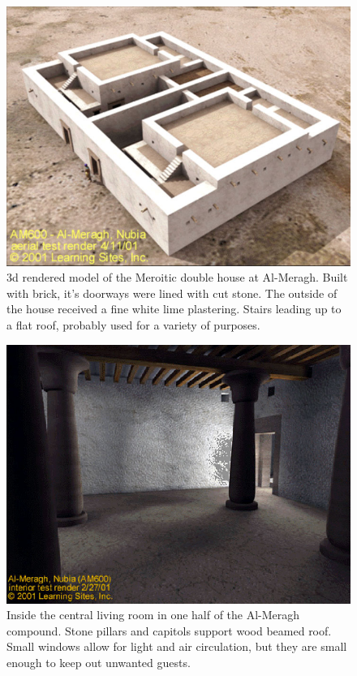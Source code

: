\documentclass[a4paper,12pt]{scrreprt}
\begin{document}
\begin{figure}[H]
	\centering
	\includegraphics[width=\textwidth]{img/house/3d_model_of_meroitic_double_house}
	\caption{3d rendered model of the Meroitic double house at Al-Meragh. Built with brick, it's doorways were lined with cut stone. The outside of the house received a fine white lime plastering. Stairs leading up to a flat roof, probably used for a variety of purposes.}
\end{figure}

\begin{figure}[H]
	\centering
	\includegraphics[width=\textwidth]{img/house/double_house_inside}
	\caption{Inside the central living room in one half of the Al-Meragh compound. Stone pillars and capitols support wood beamed roof. Small windows allow for light and air circulation, but they are small enough to keep out unwanted guests.}
\end{figure}
\end{document}
